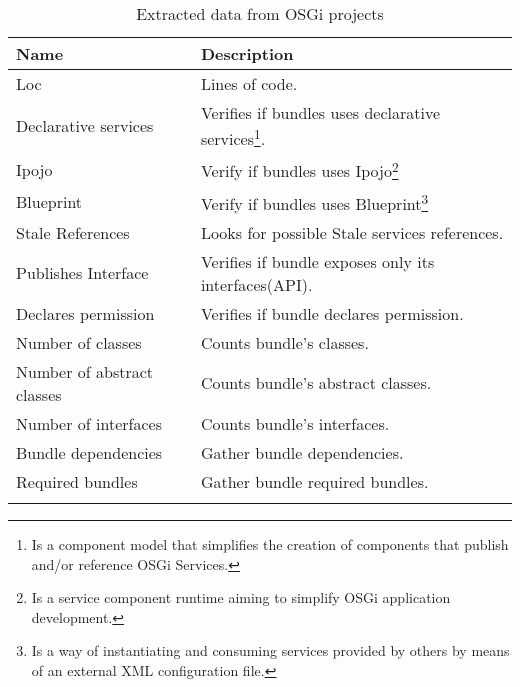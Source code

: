 \begin{table}[h]
\caption{Extracted data from OSGi projects}
\label{extracted-data}
\begin{center}
    \begin{tabular}{  p{4cm} | p{8cm} }
    \Xhline{2\arrayrulewidth}
    Name & Description\\  \hline
    Loc & Lines of code.\\ \hline
    Declarative services & Verifies if bundles uses declarative services\footnote{Is a component model that simplifies the creation of components that publish and/or reference OSGi Services.}.\\ \hline
    Ipojo & Verify if bundles uses Ipojo\footnote{Is a service component runtime aiming to simplify OSGi application development.} \\ \hline
    Blueprint & Verify if bundles uses Blueprint\footnote{Is a way of instantiating and consuming services provided by others by means of an external XML configuration file.} \\ \hline
    Stale References & Looks for possible Stale services references.\\ \hline
    Publishes Interface & Verifies if bundle exposes only its interfaces(API).\\ \hline
    Declares permission & Verifies if bundle declares permission.\\ \hline
    Number of classes & Counts bundle's classes.\\ \hline
    Number of abstract classes & Counts bundle's abstract classes.\\ \hline
    Number of interfaces & Counts bundle's interfaces.\\ \hline
    Bundle dependencies & Gather bundle dependencies.\\ \hline
    Required bundles & Gather bundle required bundles.\\ \Xhline{2\arrayrulewidth}
    \end{tabular}
\end{center}
\end{table}
\FloatBarrier 

